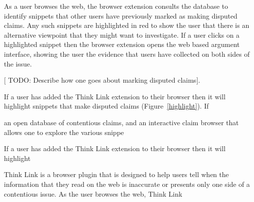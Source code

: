 \documentclass{chi2009}
\newcommand{\todo}[1]{{[\color{blue} TODO: #1]}}
\begin{document}
As a user browses the web, the browser extension consults the database to identify snippets that other users have previously marked as making disputed claims. Any such snippets are highlighted in red to show the user that there is an alternative viewpoint that they might want to investigate. If a user clicks on a highlighted snippet then the browser extension opens the web based argument interface, showing the user the evidence that users have collected on both sides of the issue.


\todo{Describe how one goes about marking disputed claims}.


If a user has added the Think Link extension to their browser then it will highlight snippets that make disputed claims (Figure~\ref{highlight}). If 

an open database of contentious claims, and an interactive claim browser that allows one to explore the various snippe

If a user has added the Think Link extension to their browser then it will highlight 

Think Link is a browser plugin that is designed to help users tell when the information that they read on the web is inaccurate or presents only one side of a contentious issue. As the user browses the web, Think Link 
\end{document}
